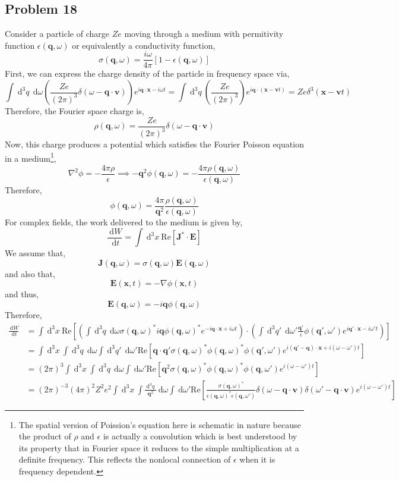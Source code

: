 \documentclass[12pt]{extarticle}
\renewcommand{\d}[1]{\: \mathrm{d}#1}
\newcommand{\dn}[2]{\: \mathrm{d}^{#1} #2 \:}
\newcommand{\deriv}[2]{\frac{\d{#1}}{\d{#2}}}
\renewcommand{\bf}[1]{\mathbf{#1}}
\renewcommand{\Re}[1]{\mathrm{Re}\left[ #1 \right]}
\theoremstyle{definition}
\begin{document}
\subsection{Problem 18}

Consider a particle of charge $Z e$ moving through a medium with permitivity function $\epsilon(\bf{q}, \omega)$ or equivalently a conductivity function,
\[ \sigma(\bf{q}, \omega) = \frac{i \omega}{4 \pi} [1 - \epsilon(\bf{q}, \omega)] \]
First, we can express the charge density of the particle in frequency space via,
\[ \int \dn{3}{q} \d{\omega} \left( \frac{Z e}{(2 \pi)^3} \delta(\omega - \bf{q} \cdot \bf{v}) \right) e^{i \bf{q} \cdot \bf{x} - i \omega t} = \int \dn{3}{q} \left( \frac{Z e}{(2 \pi)^3} \right) e^{i \bf{q} \cdot (\bf{x} - \bf{v} t)} = Z e \delta^3(\bf{x} - \bf{v} t) \]
Therefore, the Fourier space charge is,
\[ \rho(\bf{q}, \omega) = \frac{Z e}{(2 \pi)^3} \delta(\omega - \bf{q} \cdot \bf{v}) \]
Now, this charge produces a potential which satisfies the Fourier Poisson equation in a medium\footnote{The spatial version of Poission's equation here is schematic in nature because the product of $\rho$ and $\epsilon$ is actually a convolution which is best understood by its property that in Fourier space it reduces to the simple multiplication at a definite frequency. This reflects the nonlocal connection of $\epsilon$ when it is frequency dependent.},
\[ \nabla^2 \phi = - \frac{4 \pi \rho}{\epsilon} \implies - \bf{q}^2 \phi(\bf{q}, \omega) = - \frac{4 \pi \rho(\bf{q}, \omega)}{\epsilon(\bf{q}, \omega)} \]
Therefore,
\[ \phi(\bf{q}, \omega) = \frac{4 \pi}{\bf{q}^2} \frac{\rho(\bf{q}, \omega)}{\epsilon(\bf{q}, \omega)} \]
For complex fields, the work delivered to the medium is given by,
\[ \deriv{W}{t} = \int \dn{3}{x} \Re{\bf{J}^* \cdot \bf{E}} \]
We assume that,
\[ \bf{J}(\bf{q}, \omega) = \sigma(\bf{q}, \omega) \bf{E}(\bf{q}, \omega) \]
and also that,
\[ \bf{E}(\bf{x}, t) = - \nabla \phi(\bf{x}, t) \]
and thus,
\[ \bf{E}(\bf{q}, \omega) = - i \bf{q} \phi(\bf{q}, \omega) \]
Therefore,
\begin{align*}
\deriv{W}{t} & = \int \dn{3}{x} \Re{  \left( \int \dn{3}{q} \d{\omega} \sigma(\bf{q}, \omega)^* i \bf{q} \phi(\bf{q}, \omega)^* e^{-i \bf{q} \cdot \bf{x} + i \omega t} \right) \cdot \left( \int \dn{3}{q'} \d{\omega'}  \frac{\bf{q}'}{i} \phi(\bf{q}', \omega') e^{i \bf{q}' \cdot \bf{x} - i \omega' t} \right) }
\\
& = \int \dn{3}{x} \int \dn{3}{q} \d{\omega} \int \dn{3}{q'} \d{\omega'} \Re{\bf{q} \cdot \bf{q}' \sigma(\bf{q}, \omega)^* \phi(\bf{q}, \omega)^* \phi(\bf{q}', \omega') e^{i(\bf{q}' - \bf{q}) \cdot \bf{x} + i (\omega - \omega') t} }
\\
& = (2 \pi)^3 \int \dn{3}{x} \int \dn{3}{q} \d{\omega} \int\d{\omega'} \Re{\bf{q}^2 \sigma(\bf{q}, \omega)^* \phi(\bf{q}, \omega)^* \phi(\bf{q}, \omega') e^{i (\omega - \omega') t} }
\\
& = (2 \pi)^{-3} (4 \pi)^2 Z^2 e^2  \int \dn{3}{x} \int \frac{\dn{3}{q}}{\bf{q}^2} \d{\omega} \int \d{\omega'} \Re{ \frac{\sigma(\bf{q}, \omega)^*}{\epsilon(\bf{q}, \omega)^* \epsilon(\bf{q}, \omega')} \delta(\omega - \bf{q} \cdot \bf{v}) \delta(\omega' - \bf{q} \cdot \bf{v}) e^{i (\omega - \omega') t} }
\end{align*}
\end{document}

